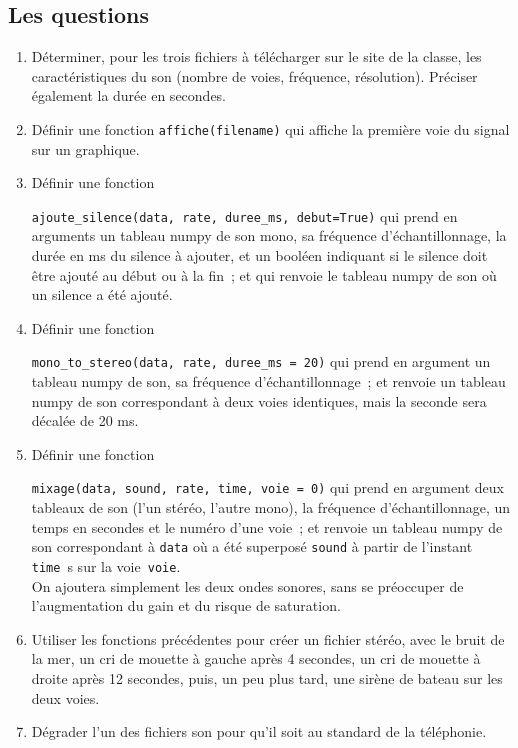 \documentclass[10pt,fleqn]{article} %
\begin{document}
\begin{multicols}{2}

\subsection*{Les questions}

\begin{enumerate}[resume*]
\item 
  Déterminer, pour les trois fichiers à télécharger sur le site de la
  classe, les caractéristiques du son (nombre de voies, fréquence,
  résolution). Préciser également la durée en secondes.  
\item 
  Définir une fonction \verb#affiche(filename)# qui affiche la
  première voie du signal sur un graphique. 
\item 
  Définir une fonction
  
  \verb#ajoute_silence(data, rate, duree_ms, debut=True)# 
  qui prend en arguments un tableau numpy de son mono, sa fréquence
  d'échantillonnage, la durée en ms du silence à ajouter, et un
  booléen indiquant si le silence doit être ajouté au début ou à la
  fin~; et qui renvoie le tableau numpy de son où un silence a été
  ajouté. 
\item 
  Définir une fonction
  
  \verb#mono_to_stereo(data, rate, duree_ms = 20)#
  qui prend en argument un tableau numpy de son, sa fréquence
  d'échantillonnage~; et renvoie un tableau numpy de son correspondant
  à deux voies identiques, mais la seconde sera décalée de 20 ms.
\item 
  Définir une fonction
  
  \verb#mixage(data, sound, rate, time, voie = 0)#
  qui prend en argument deux tableaux de son (l'un stéréo, l'autre
  mono), 
  la fréquence d'échantillonnage, un temps en secondes et le numéro
  d'une voie~; et renvoie un tableau numpy de son
  correspondant à \verb#data# où a été superposé \verb#sound# à partir
  de l'instant \verb#time#~s sur la voie~\verb#voie#. \\
  On ajoutera simplement les deux ondes sonores, sans se préoccuper de
  l'augmentation du gain et du risque de saturation. 
\item 
  Utiliser les fonctions précédentes pour créer un fichier stéréo,
  avec le bruit de la mer, un cri de mouette à gauche après 4
  secondes, un cri de mouette à droite après 12 secondes, puis, un peu
  plus tard, une sirène de bateau sur les deux voies. 

\item 
  Dégrader l'un des fichiers son pour qu'il soit au standard de la
  téléphonie. 
\end{enumerate}


\end{multicols}
\end{document}
